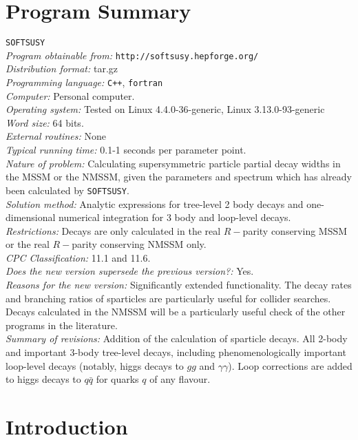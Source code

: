 \documentclass[final,3p,times,pdflatex]{elsarticle}
\def\SOFTSUSY{{\tt SOFTSUSY}}
\begin{document}
\section{Program Summary}
 \SOFTSUSY{} \\
{\em Program obtainable   from:} {\tt http://softsusy.hepforge.org/} \\
{\em Distribution format:}\/ tar.gz \\
{\em Programming language:} {\tt C++}, {\tt fortran} \\
{\em Computer:}\/ Personal computer. \\
{\em Operating system:}\/ Tested on Linux 4.4.0-36-generic, Linux 3.13.0-93-generic
\\
{\em Word size:}\/ 64 bits. \\
{\em External routines:}\/ None \\
{\em Typical running time:}\/ 0.1-1 seconds per parameter point. \\
{\em Nature of problem:}\/ Calculating supersymmetric particle partial decay
widths in the 
MSSM or the NMSSM\@, given the parameters and spectrum which has already been
calculated by \SOFTSUSY{}. \\
{\em Solution method:}\/ Analytic expressions for tree-level 2 body decays and
one-dimensional numerical integration for 3 body and loop-level decays.\\
{\em Restrictions:} Decays are only calculated in the real $R-$parity conserving
MSSM  or the real $R-$parity conserving
NMSSM only. \\
{\em CPC Classification:}\/ 11.1 and 11.6. \\
{\em Does the new version supersede the previous version?:}\/ Yes. \\
{\em Reasons for the new version:}\/ Significantly extended functionality. The
decay rates and branching ratios of sparticles are particularly useful for
collider searches. Decays calculated in the NMSSM will be a particularly
useful check of the other programs in the literature.\\
{\em Summary of revisions:}\/
Addition of the calculation of sparticle decays. 
All 2-body and important 3-body tree-level
decays, including phenomenologically important loop-level decays (notably,
higgs decays to $gg$ and $\gamma \gamma$). Loop corrections are added to higgs
decays to $q \bar q$ for quarks $q$ of any flavour.

\section{Introduction}
\end{document}
